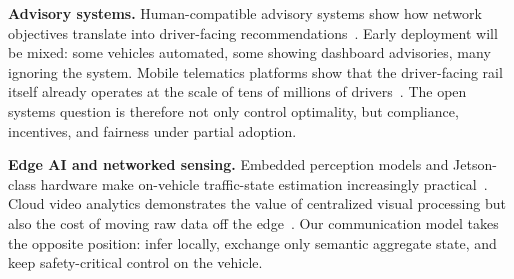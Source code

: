\noindent\textbf{Advisory systems.}
Human-compatible advisory systems show how network objectives translate into driver-facing recommendations~\cite{Yan_2023,cho2023temporal,fridman2018human}. Early deployment will be mixed: some vehicles automated, some showing dashboard advisories, many ignoring the system. Mobile telematics platforms show that the driver-facing rail itself already operates at the scale of tens of millions of drivers~\cite{cmt2025,samsara2025}. The open systems question is therefore not only control optimality, but compliance, incentives, and fairness under partial adoption.

\noindent\textbf{Edge AI and networked sensing.}
Embedded perception models and Jetson-class hardware make on-vehicle traffic-state estimation increasingly practical~\cite{nvidia2023jetson,redmon2016yolo,yang2024depth}. Cloud video analytics demonstrates the value of centralized visual processing but also the cost of moving raw data off the edge~\cite{kang2017noscope,kang2018blazeit}. Our communication model takes the opposite position: infer locally, exchange only semantic aggregate state, and keep safety-critical control on the vehicle.
\vspace{-0.4cm}
